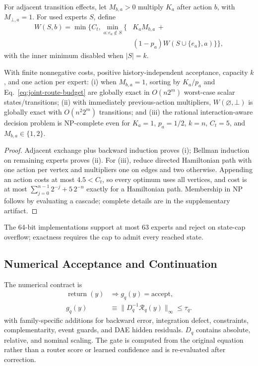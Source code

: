 For adjacent transition effects, let $M_{b,a}>0$ multiply $K_a$ after action $b$,
with $M_{\bot,a}=1$. For used experts $S$, define
\begin{equation}
\begin{aligned}
 W(S,b)=\min\{C_t,\min_{a:e_a\notin S}\{&K_aM_{b,a}\,+\\
 &(1-p_a)W(S\cup\{e_a\},a)\}\},
\end{aligned}
\label{eq:interaction-route-budget}
\end{equation}
with the inner minimum disabled when $|S|=k$.

\begin{proposition}
\label{prop:exact-finite-cascade}
\label{prop:exact-interaction-cascade}
\label{prop:interaction-hardness}
With finite nonnegative costs, positive history-independent acceptance, capacity $k$,
and one action per expert: (i) when $M_{b,a}=1$, sorting by $K_a/p_a$ and
Eq.~\eqref{eq:joint-route-budget} are globally exact in $O(n2^m)$ worst-case scalar
states/transitions; (ii) with immediately previous-action multipliers,
$W(\varnothing,\bot)$ is globally exact with $O(n^2 2^m)$ transitions; and
(iii) the rational interaction-aware decision problem is NP-complete even for
$K_a=1$, $p_a=1/2$, $k=n$, $C_t=5$, and $M_{b,a}\in\{1,2\}$.
\end{proposition}

\begin{proof}
Adjacent exchange plus backward induction proves (i); Bellman induction on remaining
experts proves (ii). For (iii), reduce directed Hamiltonian path with one action per
vertex and multipliers one on edges and two otherwise. Appending an action costs at
most $4.5<C_t$, so every optimum uses all vertices, and cost is at most
$\sum_{j=0}^{n-1}2^{-j}+5\,2^{-n}$ exactly for a Hamiltonian path. Membership in NP
follows by evaluating a cascade; complete details are in the supplementary artifact.
\end{proof}

The 64-bit implementations support at most 63 experts and reject on state-cap
overflow; exactness requires the cap to admit every reached state.

\subsection{Numerical Acceptance and Continuation}

The numerical contract is
\begin{equation}
\begin{aligned}
 \operatorname{return}(y)&\Longrightarrow g_q(y)=\mathrm{accept},\\
 g_q(y)&\equiv
 \|D_q^{-1}\mathcal{R}_q(y)\|_\infty\le \tau_q.
\end{aligned}
\label{eq:gate}
\end{equation}
with family-specific additions for backward error, integration defect,
constraints, complementarity, event guards, and DAE hidden residuals. $D_q$
contains absolute, relative, and nominal scaling. The gate is computed from the
original equation rather than a router score or learned confidence and is re-evaluated after correction.

